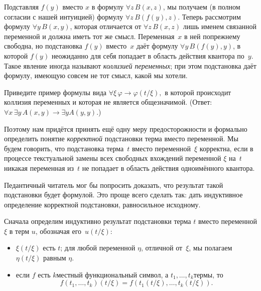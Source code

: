 Подставляя $f(y)$ вместо $x$ в формулу $\forall z\,B(x,z)$, мы
получаем (в полном согласии с нашей интуицией) формулу $\forall
z\, B(f(y),z)$. Теперь рассмотрим формулу $\forall y\,B(x,y)$,
которая отличается от $\forall z\, B(x,z)$ лишь именем связанной
переменной и должна иметь тот же смысл. Переменная~$x$ в ней
по\д прежнему свободна, но подстановка $f(y)$ вместо~$x$ даёт
формулу $\forall y\, B(f(y),y)$, в которой $f(y)$ неожиданно
для себя попадает в область действия квантора по~$y$. Такое
явление иногда называют \emph{коллизией переменных};%
при этом
подстановка даёт формулу, имеющую совсем не тот смысл, какой мы
хотели.

\begin{problem}
Приведите пример формулы вида
        $
\forall\xi\, \varphi \to \varphi(t/\xi),
        $
в которой происходит коллизия переменных и которая не является
общезначимой. (Ответ: $\forall x\,\exists y\, A(x,y)\to \exists y
A(y,y)$.)
\end{problem}

Поэтому нам придётся принять ещё одну меру предосторожности и
формально определить понятие \emph{корректной}%
%
подстановки терма
вместо переменной. Мы будем говорить, что подстановка терма~$t$
вместо переменной~$\xi$ корректна, если в процессе текстуальной
замены всех свободных вхождений переменной $\xi$ на~$t$
никакая переменная из~$t$ не попадает в область действия
одноимённого квантора.

Педантичный читатель мог бы попросить доказать, что результат
такой подстановки будет формулой. Это проще всего сделать так:
дать индуктивное определение корректной подстановки,
равносильное исходному.

Сначала определим индуктивно результат подстановки терма $t$
вместо переменной $\xi$ в терм $u$, обозначая его~$u(t/\xi)$:
\begin{itemize}
        \item
$\xi (t/\xi)$ есть $t$; для любой переменной $\eta$, отличной
от~$\xi$, мы полагаем $\eta (t/\xi)$ равным $\eta$.
        \item
если $f$ есть $k$\д местный функциональный символ, а
$t_1,\dots,t_k$\т термы, то
        $$
f(t_1,\dots,t_k)(t/\xi)=f(t_1(t/\xi),\dots,t_k(t/\xi)).
        $$
\end{itemize}

